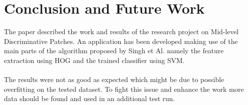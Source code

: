 \section{Conclusion and Future Work}

The paper described the work and results of the research project on Mid-level Discriminative Patches. An application has been developed making use of the main parts of the algorithm proposed by Singh et Al. namely the feature extraction using HOG and the trained classifier using SVM.
\\
\\
The results were not as good as expected which might be due to possible overfitting on the tested dataset. To fight this issue and enhance the work more data should be found and used in an additional test run.
